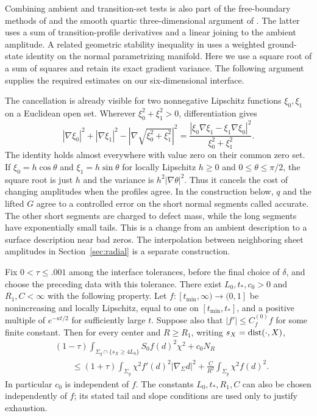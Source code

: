 Combining ambient and transition-set tests is also part of the
free-boundary methods of \citet{CFFS2025} and the smooth quartic
three-dimensional argument of \citet[Sections~3 and~5]{LLWWW2026}.
The latter uses a sum of transition-profile derivatives and a linear
joining to the ambient amplitude.  A related geometric stability
inequality in \citet[Proposition~4.7]{CFFFS2026} uses a weighted
ground-state identity on the normal parametrizing manifold.  Here we
use a square root of a sum of squares and retain its exact gradient
variance.  The following
argument supplies the required estimates on our six-dimensional
interface.

The cancellation is already visible for two nonnegative Lipschitz
functions $\xi_0,\xi_1$ on a Euclidean open set.  Wherever
$\xi_0^2+\xi_1^2>0$, differentiation gives
\[
 |\nabla\xi_0|^2+|\nabla\xi_1|^2
 -\left|\nabla\sqrt{\xi_0^2+\xi_1^2}\right|^2
 =\frac{|\xi_0\nabla\xi_1-\xi_1\nabla\xi_0|^2}
        {\xi_0^2+\xi_1^2}.
\]
The identity holds almost everywhere with value zero on their common
zero set.  If $\xi_0=h\cos\theta$ and $\xi_1=h\sin\theta$ for
locally Lipschitz $h\ge0$ and $0\le\theta\le\pi/2$, the square root is just $h$ and
the variance is $h^2|\nabla\theta|^2$.  Thus it cancels the cost of
changing amplitudes when the profiles agree.  In the construction
below, $q$ and the lifted $G$ agree to a controlled error on the short
normal segments called accurate.  The other short segments are charged
to defect mass, while the long segments have exponentially small tails.
This is a change from an ambient description to a surface description
near bad zeros.  The interpolation between neighboring sheet amplitudes
in Section~\ref{sec:radial} is a separate construction.

\begin{lemma}\label{lem:growth-gluing}
Fix $0<\tau\le .001$ among the interface tolerances, before the final
choice of $\delta$, and choose the preceding data with this tolerance.
There exist
$L_0,t_*,c_0>0$ and $R_1,C<\infty$ with the following property.
Let $f:[t_{\min},\infty)\to(0,1]$ be nonincreasing and locally Lipschitz,
equal to one on $[t_{\min},t_*]$, and a positive multiple of
$e^{-\kappa t/2}$ for sufficiently large $t$.  Suppose also that
$|f'|\le C_f^{(0)}f$ for some finite constant.  Then for every center
and $R\ge R_1$, writing $s_X=\operatorname{dist}(\cdot,X)$,
\begin{equation}\label{eq:M3}
 \begin{aligned}
 &(1-\tau)\int_{\Sigma_g\cap\{s_X\ge4L_0\}}S_0 f(d)^2\chi^2+c_0N_R\\
 &\qquad\le(1+\tau)\int_{\Sigma_g}\chi^2 f'(d)^2|\nabla_\Sigma d|^2
       +\frac C{R^2}\int_{\Sigma_g}\chi^2f(d)^2.
 \end{aligned}
\end{equation}
In particular $c_0$ is independent of $f$.  The constants $L_0,t_*,R_1,C$
can also be chosen independently of $f$; its stated tail and slope
conditions are used only to justify exhaustion.
\end{lemma}

